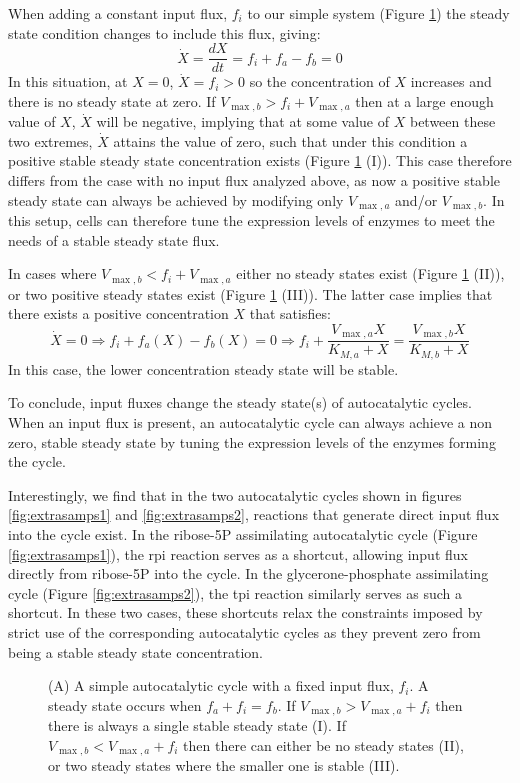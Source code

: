     When adding a constant input flux, $f_i$ to our simple system (Figure \ref{fig:inputcycle}) the steady state condition changes to include this flux, giving:
    \begin{equation*}
      \dot X = \frac{dX}{dt} = f_i + f_a - f_b = 0
    \end{equation*}
    In this situation, at $X=0$, $\dot X=f_i>0$ so the concentration of $X$ increases and there is no steady state at zero.
    If $V_{\max,b}>f_i+V_{\max,a}$ then at a large enough value of $X$, $\dot X$ will be negative, implying that at some value of $X$ between these two extremes, $\dot{X}$ attains the value of zero, such that under this condition a positive stable steady state concentration exists (Figure \ref{fig:inputcycle} (I)).
    This case therefore differs from the case with no input flux analyzed above, as now a positive stable steady state can always be achieved by modifying only $V_{\max,a}$ and/or $V_{\max,b}$.
    In this setup, cells can therefore tune the expression levels of enzymes to meet the needs of a stable steady state flux.

    In cases where $V_{\max,b}<f_i+V_{\max,a}$ either no steady states exist (Figure \ref{fig:inputcycle} (II)), or two positive steady states exist (Figure \ref{fig:inputcycle} (III)).
    The latter case implies that there exists a positive concentration $X$ that satisfies:
    \begin{equation*}
        \dot X = 0 \Rightarrow f_i + f_a(X) - f_b(X) = 0 \Rightarrow f_i+\frac{V_{\max,a}X}{K_{M,a}+X} = \frac{V_{\max,b}X}{K_{M,b}+X}
    \end{equation*}
  In this case, the lower concentration steady state will be stable.

  To conclude, input fluxes change the steady state(s) of autocatalytic cycles.
  When an input flux is present, an autocatalytic cycle can always achieve a non zero, stable steady state by tuning the expression levels of the enzymes forming the cycle.

  Interestingly, we find that in the two autocatalytic cycles shown in figures \ref{fig:extrasamps1} and \ref{fig:extrasamps2}, reactions that generate direct input flux into the cycle exist.
  In the ribose-5P assimilating autocatalytic cycle (Figure \ref{fig:extrasamps1}), the rpi reaction serves as a shortcut, allowing input flux directly from ribose-5P into the cycle.
  In the glycerone-phosphate assimilating cycle (Figure \ref{fig:extrasamps2}), the tpi reaction similarly serves as such a shortcut.
  In these two cases, these shortcuts relax the constraints imposed by strict use of the corresponding autocatalytic cycles as they prevent zero from being a stable steady state concentration.
    \begin{figure}[h!]
        \centering{
            }
      \caption{\label{fig:inputcycle}
        (A) A simple autocatalytic cycle with a fixed input flux, $f_i$.
        A steady state occurs when $f_a+f_i=f_b$.
        If $V_{\max,b}>V_{\max,a}+f_i$ then there is always a single stable steady state (I).
        If $V_{\max,b}<V_{\max,a}+f_i$ then there can either be no steady states (II), or two steady states where the smaller one is stable (III).
      }
    \end{figure}
